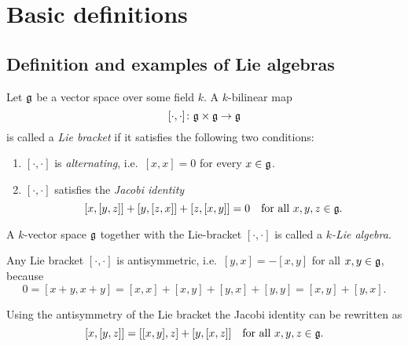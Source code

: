 \section{Basic definitions}





\subsection{Definition and examples of Lie algebras}


\begin{defi}
 Let $\mathfrak{g}$ be a vector space over some field $k$. A $k$-bilinear map
 \[
  [\cdot, \cdot] \colon \mathfrak{g} \times \mathfrak{g} \to \mathfrak{g}
 \]
 is called a \emph{Lie bracket} if it satisfies the following two conditions:
 \begin{enumerate}
  \item
   $[\cdot, \cdot]$ is \emph{alternating}, i.e.\ $[x,x] = 0$ for every $x \in \mathfrak{g}$.
  \item
   $[\cdot, \cdot]$ satisfies the \emph{Jacobi identity}
   \[
    [x,[y,z]] + [y,[z,x]] + [z,[x,y]] = 0
    \quad
    \text{for all $x,y,z \in \mathfrak{g}$}.
   \]
 \end{enumerate}
 A $k$-vector space $\mathfrak{g}$ together with the Lie-bracket $[\cdot,\cdot]$ is called a \emph{$k$-Lie algebra}.
\end{defi}


\begin{rem}
 Any Lie bracket $[\cdot, \cdot]$ is antisymmetric, i.e.\ $[y,x] = -[x,y]$ for all $x,y \in \mathfrak{g}$, because
 \[
  0 = [x+y, x+y] = [x,x] + [x,y] + [y,x] + [y,y] = [x,y] + [y,x].
 \]
\end{rem}


\begin{rem}
 Using the antisymmetry of the Lie bracket the Jacobi identity can be rewritten as
 \[
  [x,[y,z]] = [[x,y],z] + [y,[x,z]] \quad \text{for all $x,y,z \in \mathfrak{g}$}.
 \]
\end{rem}



